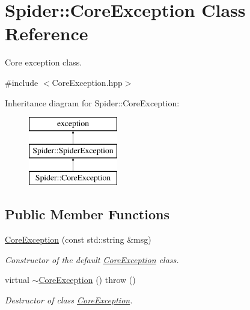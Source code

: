 \hypertarget{class_spider_1_1_core_exception}{}\section{Spider\+:\+:Core\+Exception Class Reference}
\label{class_spider_1_1_core_exception}


Core exception class.  




{\ttfamily \#include $<$Core\+Exception.\+hpp$>$}

Inheritance diagram for Spider\+:\+:Core\+Exception\+:\begin{figure}[H]
\begin{center}
\leavevmode
\includegraphics[height=3.000000cm]{class_spider_1_1_core_exception}
\end{center}
\end{figure}
\subsection*{Public Member Functions}
\begin{DoxyCompactItemize}
\item 
\hyperlink{class_spider_1_1_core_exception_a097cb8e36be15a4ee1527e7a32039da1}{Core\+Exception} (const std\+::string \&msg)
\begin{DoxyCompactList}\small\item\em Constructor of the default \hyperlink{class_spider_1_1_core_exception}{Core\+Exception} class. \end{DoxyCompactList}\item 
\mbox{\label{class_spider_1_1_core_exception_a350c0791fec090676c3630b5f4de6f27}} 
virtual \hyperlink{class_spider_1_1_core_exception_a350c0791fec090676c3630b5f4de6f27}{$\sim$\+Core\+Exception} ()  throw ()
\begin{DoxyCompactList}\small\item\em Destructor of class \hyperlink{class_spider_1_1_core_exception}{Core\+Exception}. \end{DoxyCompactList}\end{DoxyCompactItemize}


